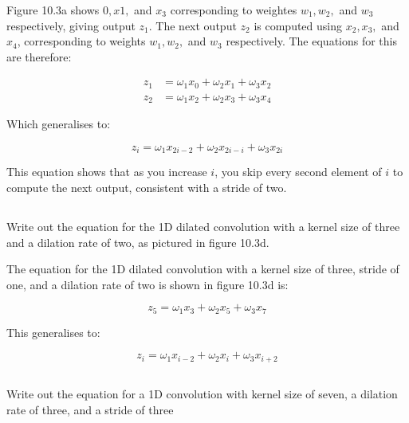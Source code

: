 \documentclass[12pt]{report}
\begin{document}
Figure 10.3a shows $0, x{1},$ and $x_{3}$ corresponding to weightes $w_{1}, w_{2},$ and $w_{3}$ respectively, giving output $z_{1}$. The next output $z_{2}$ is computed using $x_{2}, x_{3},$ and $x_{4}$, corresponding to weights $w_{1}, w_{2},$ and $w_{3}$ respectively. The equations for this are therefore:

\begin{align*}
    z_{1} & = \omega_{1}x_{0} + \omega_{2}x_{1} + \omega_{3}x_{2} \\
    z_{2} & = \omega_{1}x_{2} + \omega_{2}x_{3} + \omega_{3}x_{4}
\end{align*}

Which generalises to:

\begin{equation*}
    z_{i} = \omega_{1}x_{2i-2} + \omega_{2}x_{2i-i} + \omega_{3}x_{2i}
\end{equation*}

This equation shows that as you increase $i$, you skip every second element of $i$ to compute the next output, consistent with a stride of two.


\subsection{}
\begin{mdframed}
    Write out the equation for the 1D dilated convolution with a kernel size of three and a dilation rate of two, as pictured in figure 10.3d.
\end{mdframed}

The equation for the 1D dilated convolution with a kernel size of three, stride of one, and a dilation rate of two is shown in figure 10.3d is:

\begin{equation*}
    z_{5} = \omega_{1}x_{3} + \omega_{2}x_{5} + \omega_{3}x_{7}
\end{equation*}

This generalises to:

\begin{equation}
    z_{i} = \omega_{1}x_{i-2} + \omega_{2}x_{i} + \omega_{3}x_{i+2}
\end{equation}

\subsection{}
\begin{mdframed}
    Write out the equation for a 1D convolution with kernel size of seven, a dilation rate of three, and a stride of three
\end{mdframed}
\end{document}
